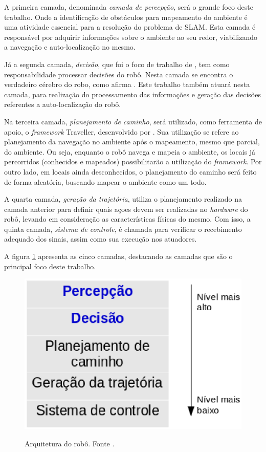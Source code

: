 		A primeira camada, denominada \textit{camada de percepção}, será o grande foco deste trabalho. Onde a identificação de obstáculos para mapeamento do ambiente é uma atividade essencial para a resolução do problema de SLAM. Esta camada é responsável por adquirir informações sobre o ambiente ao seu redor, viabilizando a navegação e auto-localização no mesmo.

		Já a segunda camada, \textit{decisão}, que foi o foco de trabalho de \cite{tccCarol}, tem como responsabilidade processar decisões do robô. Nesta camada se encontra o verdadeiro cérebro do robo, como afirma \cite{vieira}. Este trabalho também atuará nesta camada, para realização do processamento das informações e geração das decisões referentes a auto-localização do robô.

		Na terceira camada, \textit{planejamento de caminho}, será utilizado, como ferramenta de apoio, o \textit{framework} Traveller, desenvolvido por \cite{tccRodrigo}. Sua utilização se refere ao planejamento da navegação no ambiente após o mapeamento, mesmo que parcial, do ambiente. Ou seja, enquanto o robô navega e mapeia o ambiente, os locais já percorridos (conhecidos e mapeados) possibilitarão a utilização do \textit{framework}. Por outro lado, em locais ainda desconhecidos, o planejamento do caminho será feito de forma aleatória, buscando mapear o ambiente como um todo.

		A quarta camada, \textit{geração da trajetória}, utiliza o planejamento realizado na camada anterior para definir quais açoes devem ser realizadas no \textit{hardware} do robô, levando em consideração as características físicas do mesmo. Com isso, a quinta camada, \textit{sistema de controle}, é chamada para verificar o recebimento adequado dos sinais, assim como sua execução nos atuadores. 

		A figura \ref{img:camadas} apresenta as cinco camadas, destacando as camadas que são o principal foco deste trabalho.

		\begin{figure}[H]
			\centering
			\caption{Arquitetura do robô. Fonte \cite{vieira}.}
			\includegraphics[scale=0.5]{figuras/camadas.eps}
			\label{img:camadas}
		\end{figure}

